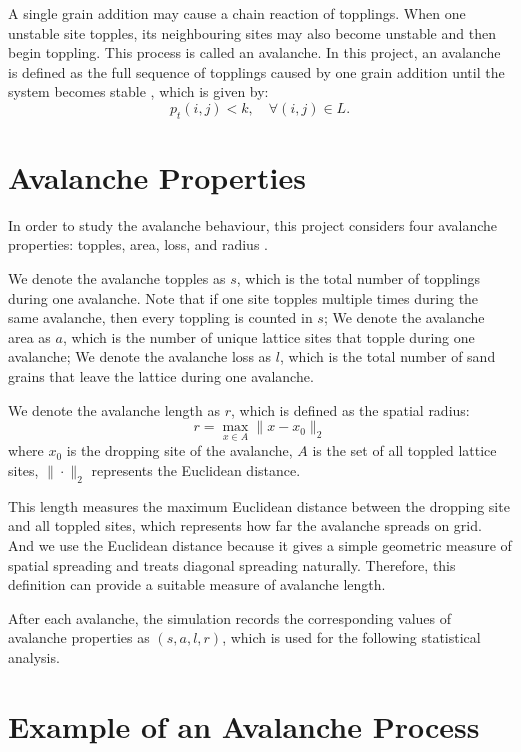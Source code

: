 A single grain addition may cause a chain reaction of topplings. When one unstable site topples, its neighbouring sites may also become unstable and then begin toppling. This process is called an avalanche. In this project, an avalanche is defined as the full sequence of topplings caused by one grain addition until the system becomes stable \citep{Project2020}, which is given by: 
$$
p_t(i,j)<k,
\quad
\forall(i,j)\in L. 
$$



\section{Avalanche Properties}

In order to study the avalanche behaviour, this project considers four avalanche properties: topples, area, loss, and radius \citep{Project2020}. 

We denote the avalanche topples as $s$, which is the total number of topplings during one avalanche. Note that if one site topples multiple times during the same avalanche, then every toppling is counted in $s$; We denote the avalanche area as $a$, which is the number of unique lattice sites that topple during one avalanche; We denote the avalanche loss as $l$, which is the total number of sand grains that leave the lattice during one avalanche. 

We denote the avalanche length as $r$, which is defined as the spatial radius:
$$
r
=
\max_{x\in A}
\|x-x_0\|_2
$$
where $x_0$ is the dropping site of the avalanche, $A$ is the set of all toppled lattice sites, $\|\cdot\|_2$ represents the Euclidean distance.

This length measures the maximum Euclidean distance between the dropping site and all toppled sites, which represents how far the avalanche spreads on grid. And we use the Euclidean distance because it gives a simple geometric measure of spatial spreading and treats diagonal spreading naturally. Therefore, this definition can provide a suitable measure of avalanche length. 

After each avalanche, the simulation records the corresponding values of avalanche properties as $(s,a,l,r)$, which is used for the following statistical analysis. 



\section{Example of an Avalanche Process}

